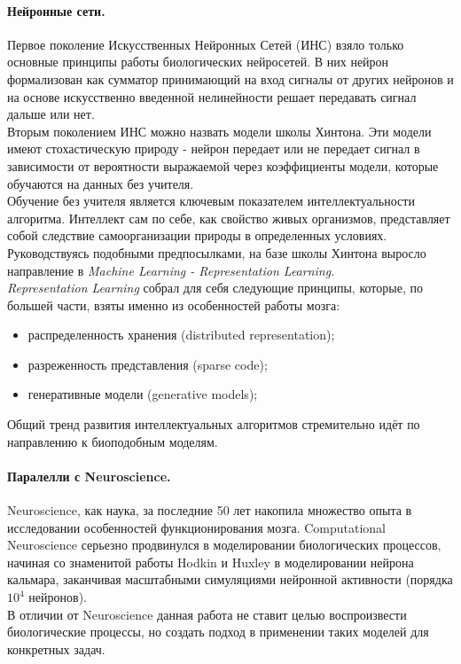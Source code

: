 \paragraph*{Нейронные сети.} Первое поколение Искусственных Нейронных Сетей (ИНС) взяло только основные принципы работы биологических нейросетей. В них нейрон формализован как сумматор принимающий на вход сигналы от других нейронов и на основе искусственно введенной нелинейности решает передавать сигнал дальше или нет.\\
\indent Вторым поколением ИНС можно назвать модели школы Хинтона\cite{hinton2006}. Эти модели имеют стохастическую природу - нейрон передает или не передает сигнал в зависимости от вероятности выражаемой через коэффициенты модели, которые обучаются на данных без учителя.\\ 
\indent Обучение без учителя является ключевым показателем интеллектуальности алгоритма. Интеллект сам по себе, как свойство живых организмов, представляет собой следствие самоорганизации природы в определенных условиях\cite{evolut}. Руководствуясь подобными предпосылками, на базе школы Хинтона выросло направление в \textit{Machine Learning - Representation Learning}\cite{yoshua}.\\
\indent \textit{Representation Learning} собрал для себя следующие принципы, которые, по большей части, взяты именно из особенностей работы мозга: 
\begin{itemize}
\item распределенность хранения (distributed representation);
\item разреженность представления (sparse code);
\item генеративные модели (generative models);
\end{itemize}
Общий тренд развития интеллектуальных алгоритмов стремительно идёт по направлению к биоподобным моделям.
\paragraph*{Паралелли с Neuroscience.} Neuroscience, как наука, за последние 50 лет накопила множество опыта в исследовании особенностей функционирования мозга. Computational Neuroscience серьезно продвинулся в моделировании биологических процессов, начиная со знаменитой работы Hodkin и Huxley\cite{hodhux} в моделировании нейрона кальмара, заканчивая масштабными симуляциями нейронной активности\cite{izh_large} (порядка $10^4$ нейронов).\\
\indent В отличии от Neuroscience данная работа не ставит целью воспроизвести биологические процессы, но создать подход в применении таких моделей для конкретных задач.
